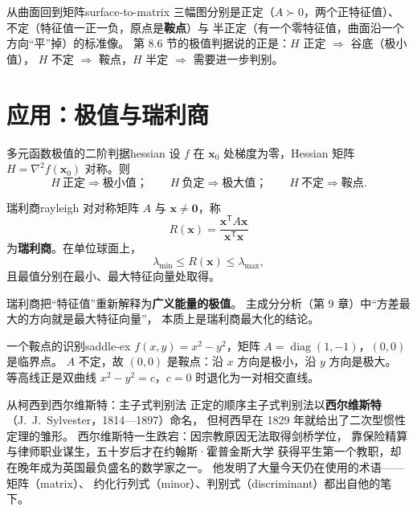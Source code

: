 \documentclass[11pt,a4paper,openany]{ctexbook}
\DeclareMathOperator{\diag}{diag}
\begin{document}
\begin{remk}{从曲面回到矩阵}{surface-to-matrix}
三幅图分别是正定（$A\succ 0$，两个正特征值）、
不定（特征值一正一负，原点是\textbf{鞍点}）与
半正定（有一个零特征值，曲面沿一个方向“平”掉）的标准像。
第 8.6 节的极值判据说的正是：$H$ 正定 $\Rightarrow$ 谷底（极小值），
$H$ 不定 $\Rightarrow$ 鞍点，$H$ 半定 $\Rightarrow$ 需要进一步判别。
\end{remk}

\section{应用：极值与瑞利商}

\begin{thm}{多元函数极值的二阶判据}{hessian}
设 $f$ 在 $\boldsymbol{x}_0$ 处梯度为零，Hessian 矩阵 $H=\nabla^2 f(\boldsymbol{x}_0)$
对称。则
\[
H\ \text{正定}\Rightarrow\text{极小值；}\qquad
H\ \text{负定}\Rightarrow\text{极大值；}\qquad
H\ \text{不定}\Rightarrow\text{鞍点}.
\]
\end{thm}

\begin{defn}{瑞利商}{rayleigh}
对对称矩阵 $A$ 与 $\boldsymbol{x}\neq\boldsymbol{0}$，称
\[
R(\boldsymbol{x})=\frac{\boldsymbol{x}^{\mathsf T}A\boldsymbol{x}}
                      {\boldsymbol{x}^{\mathsf T}\boldsymbol{x}}
\]
为\textbf{瑞利商}。在单位球面上，
\[
\lambda_{\min}\le R(\boldsymbol{x})\le\lambda_{\max},
\]
且最值分别在最小、最大特征向量处取得。
\end{defn}

\begin{keypoint}
瑞利商把“特征值”重新解释为\textbf{广义能量的极值}。
主成分分析（第 9 章）中“方差最大的方向就是最大特征向量”，
本质上是瑞利商最大化的结论。
\end{keypoint}

\begin{exmp}{一个鞍点的识别}{saddle-ex}
$f(x,y)=x^2-y^2$，矩阵 $A=\diag(1,-1)$，$(0,0)$ 是临界点。
$A$ 不定，故 $(0,0)$ 是鞍点：沿 $x$ 方向是极小，沿 $y$ 方向是极大。
等高线正是双曲线 $x^2-y^2=c$，$c=0$ 时退化为一对相交直线。
\end{exmp}

\begin{sidebar}{从柯西到西尔维斯特：主子式判别法}
正定的顺序主子式判别法以\textbf{西尔维斯特}（J.\ J.\ Sylvester，1814—1897）命名，
但柯西早在 1829 年就给出了二次型惯性定理的雏形。
西尔维斯特一生跌宕：因宗教原因无法取得剑桥学位，
靠保险精算与律师职业谋生，五十岁后才在约翰斯·霍普金斯大学
获得平生第一个教职，却在晚年成为英国最负盛名的数学家之一。
他发明了大量今天仍在使用的术语——矩阵（matrix）、
约化行列式（minor）、判别式（discriminant）都出自他的笔下。
\end{sidebar}
\end{document}

